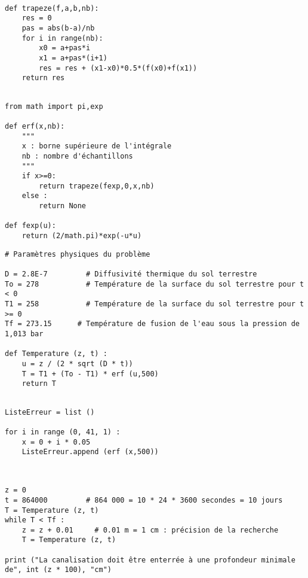 \question{} 
\begin{lstlisting}

def trapeze(f,a,b,nb):
    res = 0
    pas = abs(b-a)/nb
    for i in range(nb):
        x0 = a+pas*i
        x1 = a+pas*(i+1)
        res = res + (x1-x0)*0.5*(f(x0)+f(x1))
    return res

\end{lstlisting}

\question{} 

\begin{lstlisting}

from math import pi,exp

def erf(x,nb):
    """
    x : borne supérieure de l'intégrale
    nb : nombre d'échantillons
    """
    if x>=0:
        return trapeze(fexp,0,x,nb)
    else :
        return None

def fexp(u):
    return (2/math.pi)*exp(-u*u)

\end{lstlisting}

\question{}

\begin{lstlisting}
# Paramètres physiques du problème

D = 2.8E-7         # Diffusivité thermique du sol terrestre
To = 278           # Température de la surface du sol terrestre pour t < 0
T1 = 258           # Température de la surface du sol terrestre pour t >= 0
Tf = 273.15      # Température de fusion de l'eau sous la pression de 1,013 bar

def Temperature (z, t) :
    u = z / (2 * sqrt (D * t))
    T = T1 + (To - T1) * erf (u,500)
    return T
\end{lstlisting}

\question{} 

\begin{lstlisting}

ListeErreur = list ()

for i in range (0, 41, 1) :
    x = 0 + i * 0.05
    ListeErreur.append (erf (x,500))


\end{lstlisting}

\question{}

\begin{lstlisting}

z = 0
t = 864000         # 864 000 = 10 * 24 * 3600 secondes = 10 jours
T = Temperature (z, t)
while T < Tf :
    z = z + 0.01     # 0.01 m = 1 cm : précision de la recherche
    T = Temperature (z, t)
    
print ("La canalisation doit être enterrée à une profondeur minimale de", int (z * 100), "cm")

\end{lstlisting}